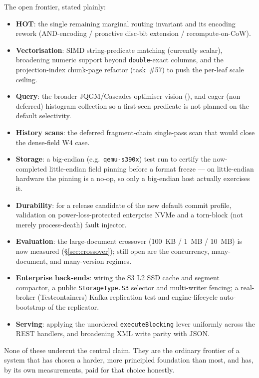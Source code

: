 \documentclass[11pt,a4paper,oneside]{report}
\theoremstyle{sirixthm}
\newcommand{\code}[1]{\texttt{#1}}
\begin{document}
The open frontier, stated plainly:

\begin{itemize}[leftmargin=1.4em]
\item \textbf{HOT}: the single remaining marginal routing invariant and its encoding rework
  (AND-encoding / proactive disc-bit extension / recompute-on-CoW).
\item \textbf{Vectorisation}: SIMD string-predicate matching (currently scalar), broadening
  numeric support beyond \code{double}-exact columns, and the projection-index chunk-page refactor
  (task~\#57) to push the per-leaf scale ceiling.
\item \textbf{Query}: the broader JQGM/Cascades optimiser vision
  (), and eager (non-deferred) histogram collection so a
  first-seen predicate is not planned on the default selectivity.
\item \textbf{History scans}: the deferred fragment-chain single-pass scan that would close
  the dense-field W4 case.
\item \textbf{Storage}: a big-endian
  (e.g.\ \code{qemu-s390x}) test run to certify the now-completed little-endian field pinning before a
  format freeze --- on little-endian hardware the pinning is a no-op, so only a big-endian host
  actually exercises it.
\item \textbf{Durability}: for a release candidate of the new default commit profile,
  validation on power-loss-protected enterprise NVMe and a torn-block (not merely
  process-death) fault injector.
\item \textbf{Evaluation}: the large-document crossover (100~KB / 1~MB / 10~MB) is now measured
  (\S\ref{sec:crossover}); still open are the concurrency, many-document, and many-version regimes.
\item \textbf{Enterprise back-ends}: wiring the S3 L2 SSD cache and segment compactor,
  a public \code{StorageType.S3} selector and multi-writer fencing; a real-broker
  (Testcontainers) Kafka replication test and engine-lifecycle auto-bootstrap of the replicator.
\item \textbf{Serving}: applying the unordered \code{executeBlocking} lever uniformly across
  the REST handlers, and broadening XML write parity with JSON.
\end{itemize}

None of these undercut the central claim. They are the ordinary frontier of a system that has
chosen a harder, more principled foundation than most, and has, by its own measurements,
paid for that choice honestly.
\end{document}
